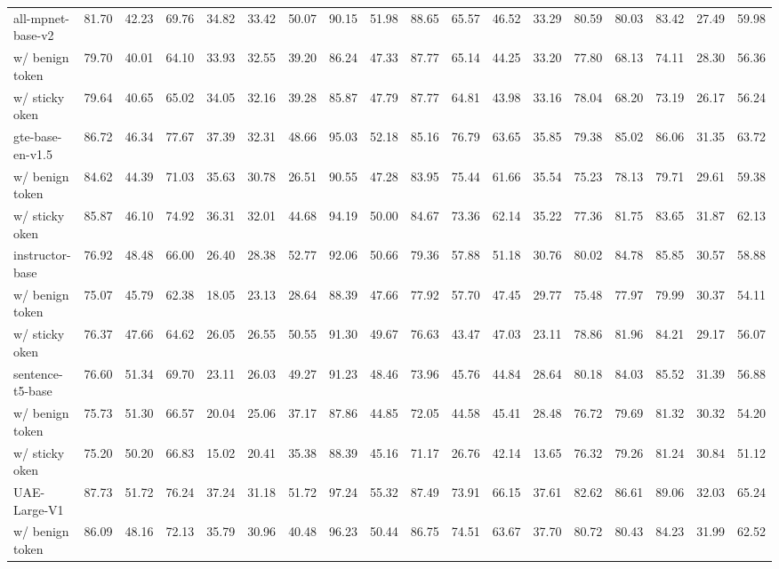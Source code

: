 \begin{tabular}{lrrrrrrrrrrrrrrrrr}
all-mpnet-base-v2 & 81.70 & 42.23 & 69.76 & 34.82 & 33.42 & 50.07 & 90.15 & 51.98 & 88.65 & 65.57 & 46.52 & 33.29 & 80.59 & 80.03 & 83.42 & 27.49 & 59.98 \\
w/ benign token & 79.70 & 40.01 & 64.10 & 33.93 & 32.55 & 39.20 & 86.24 & 47.33 & 87.77 & 65.14 & 44.25 & 33.20 & 77.80 & 68.13 & 74.11 & 28.30 & 56.36 \\
w/ sticky oken & 79.64 & 40.65 & 65.02 & 34.05 & 32.16 & 39.28 & 85.87 & 47.79 & 87.77 & 64.81 & 43.98 & 33.16 & 78.04 & 68.20 & 73.19 & 26.17 & 56.24 \\
gte-base-en-v1.5 & 86.72 & 46.34 & 77.67 & 37.39 & 32.31 & 48.66 & 95.03 & 52.18 & 85.16 & 76.79 & 63.65 & 35.85 & 79.38 & 85.02 & 86.06 & 31.35 & 63.72 \\
w/ benign token & 84.62 & 44.39 & 71.03 & 35.63 & 30.78 & 26.51 & 90.55 & 47.28 & 83.95 & 75.44 & 61.66 & 35.54 & 75.23 & 78.13 & 79.71 & 29.61 & 59.38 \\
w/ sticky oken & 85.87 & 46.10 & 74.92 & 36.31 & 32.01 & 44.68 & 94.19 & 50.00 & 84.67 & 73.36 & 62.14 & 35.22 & 77.36 & 81.75 & 83.65 & 31.87 & 62.13 \\
instructor-base & 76.92 & 48.48 & 66.00 & 26.40 & 28.38 & 52.77 & 92.06 & 50.66 & 79.36 & 57.88 & 51.18 & 30.76 & 80.02 & 84.78 & 85.85 & 30.57 & 58.88 \\
w/ benign token & 75.07 & 45.79 & 62.38 & 18.05 & 23.13 & 28.64 & 88.39 & 47.66 & 77.92 & 57.70 & 47.45 & 29.77 & 75.48 & 77.97 & 79.99 & 30.37 & 54.11 \\
w/ sticky oken & 76.37 & 47.66 & 64.62 & 26.05 & 26.55 & 50.55 & 91.30 & 49.67 & 76.63 & 43.47 & 47.03 & 23.11 & 78.86 & 81.96 & 84.21 & 29.17 & 56.07 \\
sentence-t5-base & 76.60 & 51.34 & 69.70 & 23.11 & 26.03 & 49.27 & 91.23 & 48.46 & 73.96 & 45.76 & 44.84 & 28.64 & 80.18 & 84.03 & 85.52 & 31.39 & 56.88 \\
w/ benign token & 75.73 & 51.30 & 66.57 & 20.04 & 25.06 & 37.17 & 87.86 & 44.85 & 72.05 & 44.58 & 45.41 & 28.48 & 76.72 & 79.69 & 81.32 & 30.32 & 54.20 \\
w/ sticky oken & 75.20 & 50.20 & 66.83 & 15.02 & 20.41 & 35.38 & 88.39 & 45.16 & 71.17 & 26.76 & 42.14 & 13.65 & 76.32 & 79.26 & 81.24 & 30.84 & 51.12 \\
UAE-Large-V1 & 87.73 & 51.72 & 76.24 & 37.24 & 31.18 & 51.72 & 97.24 & 55.32 & 87.49 & 73.91 & 66.15 & 37.61 & 82.62 & 86.61 & 89.06 & 32.03 & 65.24 \\
w/ benign token & 86.09 & 48.16 & 72.13 & 35.79 & 30.96 & 40.48 & 96.23 & 50.44 & 86.75 & 74.51 & 63.67 & 37.70 & 80.72 & 80.43 & 84.23 & 31.99 & 62.52 \\

\end{tabular}
